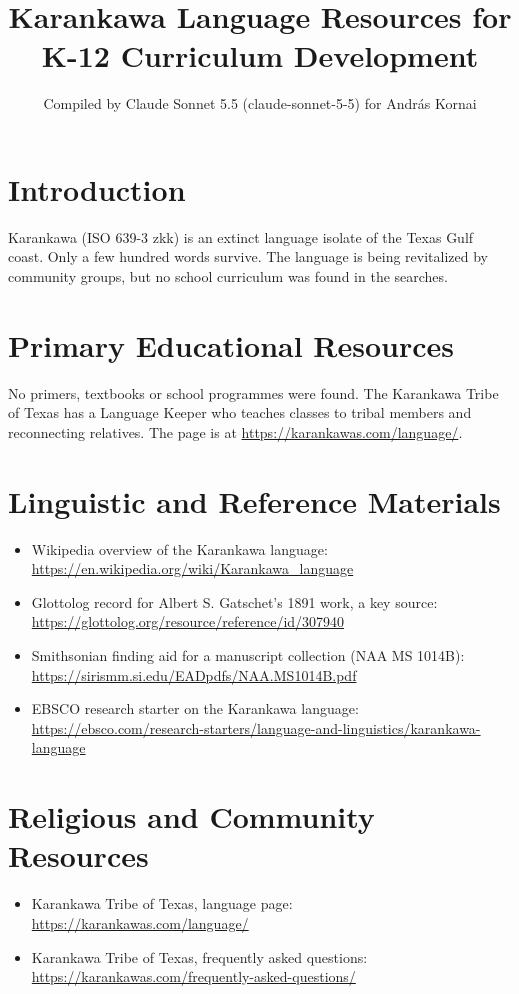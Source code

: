 \documentclass[12pt]{article}
\title{Karankawa Language Resources for K-12 Curriculum Development}
\author{Compiled by Claude Sonnet 5.5 (claude-sonnet-5-5) for Andr\'as Kornai}
\date{}
\begin{document}
\maketitle

\section{Introduction}
Karankawa (ISO 639-3 zkk) is an extinct language isolate of the Texas Gulf coast. Only a few hundred words survive. The language is being revitalized by community groups, but no school curriculum was found in the searches.

\section{Primary Educational Resources}
No primers, textbooks or school programmes were found. The Karankawa Tribe of Texas has a Language Keeper who teaches classes to tribal members and reconnecting relatives. The page is at \url{https://karankawas.com/language/}.

\section{Linguistic and Reference Materials}
\begin{itemize}
\item Wikipedia overview of the Karankawa language: \url{https://en.wikipedia.org/wiki/Karankawa_language}
\item Glottolog record for Albert S. Gatschet's 1891 work, a key source: \url{https://glottolog.org/resource/reference/id/307940}
\item Smithsonian finding aid for a manuscript collection (NAA MS 1014B): \url{https://sirismm.si.edu/EADpdfs/NAA.MS1014B.pdf}
\item EBSCO research starter on the Karankawa language: \url{https://ebsco.com/research-starters/language-and-linguistics/karankawa-language}
\end{itemize}

\section{Religious and Community Resources}
\begin{itemize}
\item Karankawa Tribe of Texas, language page: \url{https://karankawas.com/language/}
\item Karankawa Tribe of Texas, frequently asked questions: \url{https://karankawas.com/frequently-asked-questions/}
\end{itemize}
\end{document}
